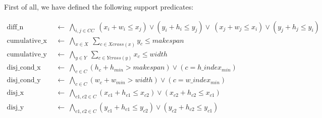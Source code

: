     First of all, we have defined the following support predicates:

    \begin{align}
      \text{diff\_n}\ &\ \leftarrow\ \bigwedge_{i,j \in CC}\ (x_i + w_i \leq x_j) \lor (y_i + h_i \leq y_j) \lor\ (x_j + w_j \leq x_i) \lor (y_j + h_j \leq y_i) \label{eq:diffn} \\
      \text{cumulative\_x}\ &\ \leftarrow\ \bigwedge_{x \in X}\ \sum_{c \in Xcross(x)} y_c \leq makespan \label{eq:cumulative_x} \\
      \text{cumulative\_y}\ &\ \leftarrow\ \bigwedge_{y \in Y}\ \sum_{c \in Ycross(y)} x_c \leq width \label{eq:cumulative_y} \\
      \text{disj\_cond\_x}\ &\ \leftarrow\ \bigwedge_{c \in C} (h_c + h_{min} > makespan) \lor (c = h\_index_{min}) \\
      \text{disj\_cond\_y}\ &\ \leftarrow\ \bigwedge_{c \in C} (w_c + w_{min} > width) \lor (c = w\_index_{min}) \\
      \text{disj\_x}\ &\ \leftarrow\ \bigwedge_{c1,c2 \in C} (x_{c1} + h_{c1} \leq x_{c2}) \lor (x_{c2} + h_{c2} \leq x_{c1}) \\
      \text{disj\_y}\ &\ \leftarrow\ \bigwedge_{c1,c2 \in C} (y_{c1} + h_{c1} \leq y_{c2}) \lor (y_{c2} + h_{c2} \leq y_{c1})
    \end{align}

